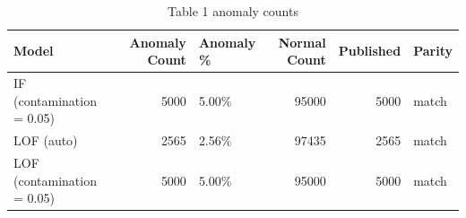 \begin{table}
\caption{Table 1 anomaly counts}
\label{tab:table_1_anomaly_counts}
\begin{tabular}{lrlrrl}
\toprule
Model & Anomaly Count & Anomaly \% & Normal Count & Published & Parity \\
\midrule
IF (contamination = 0.05) & 5000 & 5.00\% & 95000 & 5000 & match \\
LOF (auto) & 2565 & 2.56\% & 97435 & 2565 & match \\
LOF (contamination = 0.05) & 5000 & 5.00\% & 95000 & 5000 & match \\
\bottomrule
\end{tabular}
\end{table}
